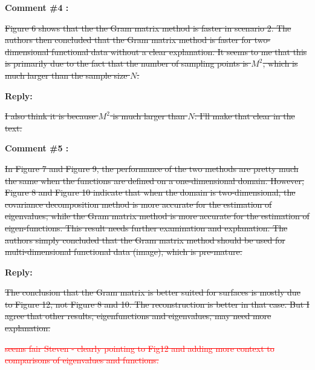 \documentclass[11pt]{article}
\begin{document}
\bigskip

\itshape


\textbf{Comment \#4 :}

\sout{Figure 6 shows that the the Gram matrix method is faster in scenario 2. The authors then concluded that the Gram matrix method is faster for two-dimensional functional data without a clear explanation. It seems to me that this is primarily due to the fact that the number of sampling points is $M^2$, which is much larger than the sample size $N$.}

\medskip

\normalfont

\textbf{Reply:} 

\sout{I also think it is because $M^2$ is much larger than $N$. I'll make that clear in the text.}

\bigskip

\itshape


\textbf{Comment \#5 :}

\sout{In Figure 7 and Figure 9, the performance of the two methods are pretty much the same when the functions are defined on a one-dimensional domain. However, Figure 8 and Figure 10 indicate that when the domain is two-dimensional, the covariance decomposition method is more accurate for the estimation of eigenvalues; while the Gram matrix method is more accurate for the estimation of eigen-functions. This result needs further examination and explanation. The authors simply concluded that the Gram matrix method should be used for multi-dimensional functional data (image), which is pre-mature.}

\medskip

\normalfont

\textbf{Reply:} 

\sout{The conclusion that the Gram matrix is better suited for surfaces is mostly due to Figure 12, not Figure 8 and 10. The reconstruction is better in that case. 
But I agree that other results, eigenfunctions and eigenvalues, may need more explanation.}

\textcolor{red}{\sout{seems fair Steven - clearly pointing to Fig12 and adding more context to comparisons of eigenvalues and functions.}}



 
\end{document}
